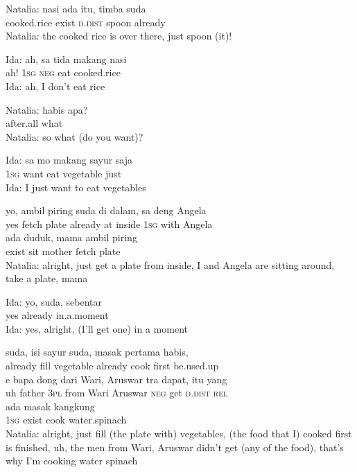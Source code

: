 \ea
\gll   Natalia:   nasi   ada   itu,   timba   suda\\
  {}   cooked.rice   exist   \textsc{d.dist}   spoon   already\\
\glt
Natalia: the cooked rice is over there, just spoon (it)!
\z

\ea
\gll   Ida:   ah,   sa   tida   makang   nasi\\
{} ah!   \textsc{1sg}   \textsc{neg}   eat   cooked.rice\\
\glt
Ida: ah, I don’t eat rice
\z

\ea
\gll   Natalia:   habis   apa?\\
{}     after.all   what\\
\glt
Natalia: so what (do you want)?
\z

\ea
\gll   Ida:   sa   mo   makang   sayur   saja\\
    {}  \textsc{1sg}   want   eat   vegetable   just\\
\glt
Ida: I just want to eat vegetables
\z

\ea
{}   yo,   ambil    {piring}    {suda}   di   dalam,   sa   deng   Angela\\
   {}   yes   fetch    {plate}    {already}   at   inside   \textsc{1sg}   with   Angela\\
\gll  ada    {duduk,}    {mama}    {ambil}    {piring}\\
  exist    {sit}    {mother}    {fetch}    {plate}\\
\glt
Natalia: alright, just get a plate from inside, I and Angela are sitting around, take a plate, mama
\z

\ea
\gll   Ida:   yo,   suda,   sebentar\\
  {}   yes   already   in.a.moment\\
\glt
Ida: yes, alright, (I’ll get one) in a moment
\z

\ea
{}    {suda,}    {isi}    {sayur}    {suda,}    {masak}    {pertama}    {habis,}\\
   {}    {already}    {fill}    {vegetable}    {already}    {cook}    {first}    {be.used.up}\\
\gll  e    {bapa}    {dong}    {dari}    {Wari,}    {Aruswar}   tra   dapat,    {itu}   yang\\
  uh    {father}    {\textsc{3pl}}    {from}    {Wari}    {Aruswar}   \textsc{neg}   get    {\textsc{d.dist}}   \textsc{rel}\\
    {ada}    {masak}    {kangkung}\\
   {\textsc{1sg}}    {exist}    {cook}    {water.spinach}\\
\glt
Natalia: alright, just fill (the plate with) vegetables, (the food that I) cooked first is finished, uh, the men from Wari, Aruswar didn’t get (any of the food), that’s why I’m cooking water spinach
\z

